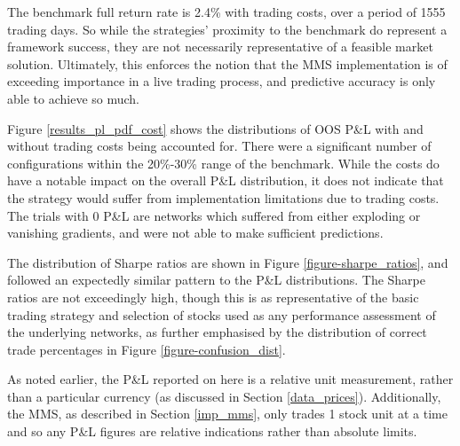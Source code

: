 \documentclass[a4paper,11pt,oneside]{article}
\theoremstyle{plain}
\theoremstyle{definition}
\begin{document}
	The benchmark full return rate is 2.4\% with trading costs, over a period of 1555 trading days. So while the strategies' proximity to the benchmark do represent a framework success, they are not necessarily representative of a feasible market solution. Ultimately, this enforces the notion that the MMS implementation is of exceeding importance in a live trading process, and predictive accuracy is only able to achieve so much. \newline
	
	Figure \ref{results_pl_pdf_cost} shows the distributions of OOS P\&L with and without trading costs being accounted for. There were a significant number of configurations within the 20\%-30\% range of the benchmark. While the costs do have a notable impact on the overall P\&L distribution, it does not indicate that the strategy would suffer from implementation limitations due to trading costs. The trials with 0 P\&L are networks which suffered from either exploding or vanishing gradients, and were not able to make sufficient predictions.\newline 
	
	The distribution of Sharpe ratios are shown in Figure \ref{figure-sharpe_ratios}, and followed an expectedly similar pattern to the P\&L distributions. The Sharpe ratios are not exceedingly high, though this is as representative of the basic trading strategy and selection of stocks used as any performance assessment of the underlying networks, as further emphasised by the distribution of correct trade percentages in Figure \ref{figure-confusion_dist}. \newline 
	
	As noted earlier, the P\&L reported on here is a relative unit measurement, rather than a particular currency (as discussed in Section \ref{data_prices}). Additionally, the MMS, as described in Section \ref{imp_mms}, only trades 1 stock unit at a time and so any P\&L figures are relative indications rather than absolute limits.
	
\end{document}
